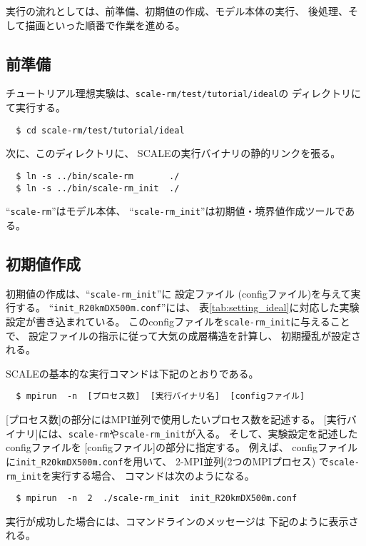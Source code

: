 実行の流れとしては、前準備、初期値の作成、モデル本体の実行、
後処理、そして描画といった順番で作業を進める。

\subsection{前準備}
チュートリアル理想実験は、\verb|scale-rm/test/tutorial/ideal|の
ディレクトリにて実行する。
\begin{verbatim}
  $ cd scale-rm/test/tutorial/ideal
\end{verbatim}
次に、このディレクトリに、
SCALEの実行バイナリの静的リンクを張る。
\begin{verbatim}
  $ ln -s ../bin/scale-rm       ./
  $ ln -s ../bin/scale-rm_init  ./
\end{verbatim}
``\verb|scale-rm|''はモデル本体、
``\verb|scale-rm_init|''は初期値・境界値作成ツールである。


\subsection{初期値作成}
初期値の作成は、``\verb|scale-rm_init|''に
設定ファイル (configファイル)を与えて実行する。
``\verb|init_R20kmDX500m.conf|''には、
表\ref{tab:setting_ideal}に対応した実験設定が書き込まれている。
このconfigファイルを\verb|scale-rm_init|に与えることで、
設定ファイルの指示に従って大気の成層構造を計算し、
初期擾乱が設定される。


SCALEの基本的な実行コマンドは下記のとおりである。
\begin{verbatim}
  $ mpirun  -n  [プロセス数]  [実行バイナリ名]  [configファイル]
\end{verbatim}
[プロセス数]の部分にはMPI並列で使用したいプロセス数を記述する。
[実行バイナリ]には、\verb|scale-rm|や\verb|scale-rm_init|が入る。
そして、実験設定を記述したconfigファイルを
[configファイル]の部分に指定する。
%
例えば、
configファイルに\verb|init_R20kmDX500m.conf|を用いて、
2-MPI並列(2つのMPIプロセス)
で\verb|scale-rm_init|を実行する場合、
コマンドは次のようになる。
\begin{verbatim}
  $ mpirun  -n  2  ./scale-rm_init  init_R20kmDX500m.conf
\end{verbatim}
%
\noindent 実行が成功した場合には、コマンドラインのメッセージは
下記のように表示される。\\

